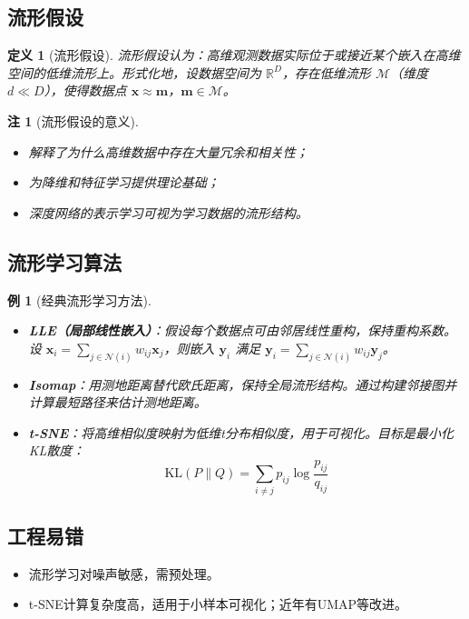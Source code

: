 \documentclass[UTF8, 10pt]{ctexart}
\newtheorem{definition}{定义}[section]
\newtheorem{example}{例}[section]
\newtheorem{remark}{注}[section]
\newcommand{\R}{\mathbb{R}}
\begin{document}
\subsection{流形假设}
\begin{definition}[流形假设]
流形假设认为：高维观测数据实际位于或接近某个嵌入在高维空间的低维流形上。形式化地，设数据空间为 $\R^D$，存在低维流形 $\mathcal{M}$（维度 $d \ll D$），使得数据点 $\bm{x} \approx \bm{m}$，$\bm{m} \in \mathcal{M}$。
\end{definition}

\begin{remark}[流形假设的意义]
\begin{itemize}
    \item 解释了为什么高维数据中存在大量冗余和相关性；
    \item 为降维和特征学习提供理论基础；
    \item 深度网络的表示学习可视为学习数据的流形结构。
\end{itemize}
\end{remark}

\subsection{流形学习算法}
\begin{example}[经典流形学习方法]
\begin{itemize}
    \item \textbf{LLE（局部线性嵌入）}：假设每个数据点可由邻居线性重构，保持重构系数。设 $\bm{x}_i = \sum_{j \in \mathcal{N}(i)} w_{ij} \bm{x}_j$，则嵌入 $\bm{y}_i$ 满足 $\bm{y}_i = \sum_{j \in \mathcal{N}(i)} w_{ij} \bm{y}_j$。
    \item \textbf{Isomap}：用测地距离替代欧氏距离，保持全局流形结构。通过构建邻接图并计算最短路径来估计测地距离。
    \item \textbf{t-SNE}：将高维相似度映射为低维t分布相似度，用于可视化。目标是最小化KL散度：
    \[
    \text{KL}(P\|Q) = \sum_{i \neq j} p_{ij} \log \frac{p_{ij}}{q_{ij}}
    \]
\end{itemize}
\end{example}

\subsection{工程易错}
\begin{itemize}
    \item 流形学习对噪声敏感，需预处理。
    \item t-SNE计算复杂度高，适用于小样本可视化；近年有UMAP等改进。
\end{itemize}
\end{document}
